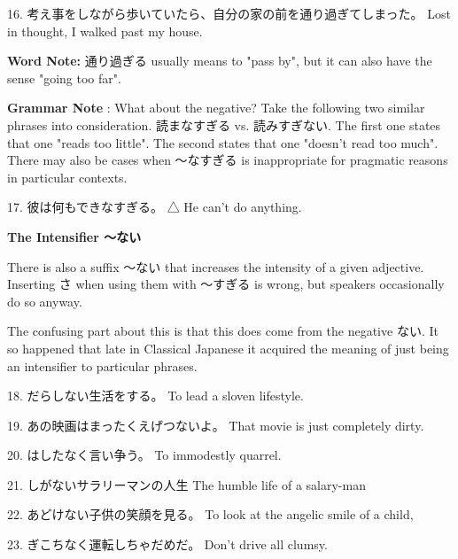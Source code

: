 \par{16. 考え事をしながら歩いていたら、自分の家の前を通り過ぎてしまった。 \hfill\break
Lost in thought, I walked past my house. }

\par{\textbf{Word Note: }通り過ぎる usually means to "pass by", but it can also have the sense "going too far". }

\par{\textbf{Grammar Note }: What about the negative? Take the following two similar phrases into consideration. 読まなすぎる vs. 読みすぎない. The first one states that one "reads too little". The second states that one "doesn't read too much". There may also be cases when ～なすぎる is inappropriate for pragmatic reasons in particular contexts. }

\par{17. 彼は何もできなすぎる。 △ \hfill\break
He can't do anything. }

\begin{center}
 \textbf{The Intensifier ～ない }
\end{center}

\par{ There is also a suffix ～ない that increases the intensity of a given adjective. Inserting さ when using them with ～すぎる is wrong, but speakers occasionally do so anyway. }

\par{ The confusing part about this is that this does come from the negative ない. It so happened that late in Classical Japanese it acquired the meaning of just being an intensifier to particular phrases. }

\par{18. だらしない生活をする。 \hfill\break
To lead a sloven lifestyle. }

\par{19. あの映画はまったくえげつないよ。 \hfill\break
That movie is just completely dirty. }

\par{20. はしたなく言い争う。 \hfill\break
To immodestly quarrel. }

\par{21. しがないサラリーマンの人生 \hfill\break
The humble life of a salary-man }

\par{22. あどけない子供の笑顔を見る。 \hfill\break
To look at the angelic smile of a child, }

\par{23. ぎこちなく運転しちゃだめだ。 \hfill\break
Don't drive all clumsy. }

